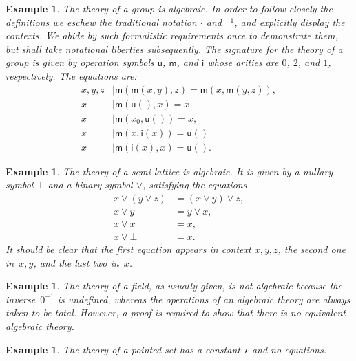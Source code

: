 \documentclass{amsart}
\newtheorem{example}[definition]{Example}
\begin{document}
\begin{example}
  \label{ex:theory-group}
  The theory of a group is algebraic. In order to follow closely the definitions we eschew
  the traditional notation $\cdot$ and ${}^{-1}$, and explicitly display the contexts. We
  abide by such formalistic requirements once to demonstrate them, but shall take
  notational liberties subsequently.
  The signature for the theory of a group is given by operation symbols $\mathsf{u}$,
  $\mathsf{m}$, and $\mathsf{i}$ whose arities are $0$, $2$, and $1$, respectively. The
  equations are:
  \begin{align*}
    x, y, z &\mid \mathsf{m}(\mathsf{m}(x, y), z) = \mathsf{m}(x, \mathsf{m}(y, z)),\\
    x &\mid \mathsf{m}(\mathsf{u}(), x) = x \\
    x &\mid \mathsf{m}(x_0, \mathsf{u}()) = x,\\
    x &\mid \mathsf{m}(x, \mathsf{i}(x)) = \mathsf{u}()\\
    x &\mid \mathsf{m}(\mathsf{i}(x), x) = \mathsf{u}().
  \end{align*}
\end{example}

\begin{example}
  \label{ex:semi-lattice}
  The theory of a semi-lattice is algebraic. It is given by a nullary symbol $\bot$ and a
  binary symbol $\vee$, satisfying the equations
  \begin{align*}
    x \vee (y \vee z) &= (x \vee y) \vee z,\\
    x \vee y &= y \vee x,\\
    x \vee x &= x,\\
    x \vee \bot &= x.
  \end{align*}
  It should be clear that the first equation appears in context $x, y, z$, the second one
  in~$x, y$, and the last two in~$x$.
\end{example}

\begin{example}
  \label{ex:field}
  The theory of a field, as usually given, is not algebraic because the inverse~$0^{-1}$
  is undefined, whereas the operations of an algebraic theory are always taken to be
  total. However, a proof is required to show that there is no equivalent algebraic theory.
\end{example}

\begin{example}
  \label{ex:pointed-set}
  The theory of a \emph{pointed set} has a constant $\star$ and no equations.
\end{example}
\end{document}
